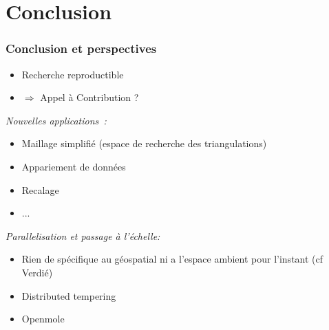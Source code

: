 \documentclass{beamer}
\begin{document}
\section{Conclusion}
\begin{frame}
\frametitle{Conclusion et perspectives}
\begin{itemize}
\item Recherche reproductible
\item $\Rightarrow$ Appel à Contribution ?
\end{itemize}
\emph{Nouvelles applications~:} 
\begin{itemize}
\item Maillage simplifié (espace de recherche des triangulations)
\item Appariement de données
\item Recalage
\item ...
\end{itemize}

\emph{Parallelisation et passage à l'échelle:} 
\begin{itemize}
\item Rien de spécifique au géospatial ni a l'espace ambient pour l'instant (cf Verdié)
\item Distributed tempering
\item Openmole
\end{itemize}

\end{frame}
\end{document}
